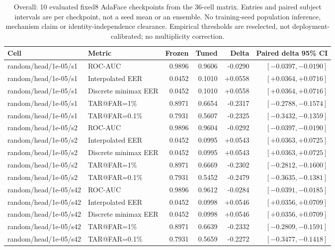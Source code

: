 \begin{table}[!t]
\caption{Overall: 10 evaluated fixed8 AdaFace checkpoints from the 36-cell matrix. Entries and paired subject intervals are per checkpoint, not a seed mean or an ensemble. No training-seed population inference, mechanism claim or identity-independence clearance. Empirical thresholds are reselected, not deployment-calibrated; no multiplicity correction.}
\label{tab:strong-fixed8-overall}
\centering\scriptsize
\begin{tabular}{@{}llrrrr@{}}
\toprule
Cell & Metric & Frozen & Tuned & Delta & Paired delta 95\% CI \\
\midrule
random/head/1e-05/s1 & ROC-AUC & 0.9896 & 0.9606 & -0.0290 & $[-0.0397,-0.0190]$ \\
random/head/1e-05/s1 & Interpolated EER & 0.0452 & 0.1010 & +0.0558 & $[+0.0364,+0.0716]$ \\
random/head/1e-05/s1 & Discrete minimax EER & 0.0452 & 0.1010 & +0.0558 & $[+0.0364,+0.0716]$ \\
random/head/1e-05/s1 & TAR@FAR=1\% & 0.8971 & 0.6654 & -0.2317 & $[-0.2788,-0.1574]$ \\
random/head/1e-05/s1 & TAR@FAR=0.1\% & 0.7931 & 0.5607 & -0.2325 & $[-0.3432,-0.1359]$ \\
random/head/1e-05/s2 & ROC-AUC & 0.9896 & 0.9604 & -0.0292 & $[-0.0397,-0.0190]$ \\
random/head/1e-05/s2 & Interpolated EER & 0.0452 & 0.0995 & +0.0543 & $[+0.0363,+0.0725]$ \\
random/head/1e-05/s2 & Discrete minimax EER & 0.0452 & 0.0995 & +0.0543 & $[+0.0363,+0.0725]$ \\
random/head/1e-05/s2 & TAR@FAR=1\% & 0.8971 & 0.6669 & -0.2302 & $[-0.2812,-0.1600]$ \\
random/head/1e-05/s2 & TAR@FAR=0.1\% & 0.7931 & 0.5452 & -0.2479 & $[-0.3635,-0.1381]$ \\
random/head/1e-05/s42 & ROC-AUC & 0.9896 & 0.9612 & -0.0284 & $[-0.0391,-0.0185]$ \\
random/head/1e-05/s42 & Interpolated EER & 0.0452 & 0.0998 & +0.0546 & $[+0.0356,+0.0709]$ \\
random/head/1e-05/s42 & Discrete minimax EER & 0.0452 & 0.0998 & +0.0546 & $[+0.0356,+0.0709]$ \\
random/head/1e-05/s42 & TAR@FAR=1\% & 0.8971 & 0.6639 & -0.2332 & $[-0.2809,-0.1591]$ \\
random/head/1e-05/s42 & TAR@FAR=0.1\% & 0.7931 & 0.5659 & -0.2272 & $[-0.3477,-0.1418]$ \\

\end{tabular}
\end{table}
